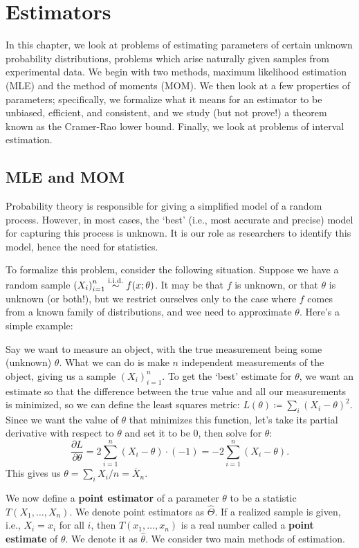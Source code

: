 \chapter{Estimators}
In this chapter, we look at problems of estimating parameters of certain unknown probability distributions, problems which arise naturally given samples from experimental data. 
We begin with two methods, maximum likelihood estimation (MLE) and the method of moments (MOM). 
We then look at a few properties of parameters; specifically, we formalize what it means for an estimator to be unbiased, efficient, and consistent, and we study (but not prove!) a theorem known as the Cramer-Rao lower bound. 
Finally, we look at problems of interval estimation. 

\section{MLE and MOM}
Probability theory is responsible for giving a simplified model of a random process. 
However, in most cases, the `best' (i.e., most accurate and precise) model for capturing this process is unknown. 
It is our role as researchers to identify this model, hence the need for statistics. 

To formalize this problem, consider the following situation. 
Suppose we have a random sample \({(X_i)}_{i=1}^n \stackrel{\mathrm{i.i.d.}}{\sim} f(x; \theta)\). 
It may be that \(f\) is unknown, or that \(\theta\) is unknown (or both!), but we restrict ourselves only to the case where \(f\) comes from a known family of distributions, and wee need to approximate \(\theta\). 
Here's a simple example: 
\begin{example}
    Say we want to measure an object, with the true measurement being some (unknown) \(\theta\). 
    What we can do is make \(n\) independent measurements of the object, giving us a sample \({(X_i)}_{i=1}^n\). 
    To get the `best' estimate for \(\theta\), we want an estimate so that the difference between the true value and all our measurements is minimized, so we can define the least squares metric: \(L(\theta) \coloneq \sum_i {(X_i - \theta)}^2\). 
    Since we want the value of \(\theta\) that minimizes this function, let's take its partial derivative with respect to \(\theta\) and set it to be 0, then solve for \(\theta\):\[
    \frac{\partial L}{\partial \theta} = 2\sum_{i=1}^n (X_i - \theta) \cdot (-1) = -2\sum_{i=1}^n (X_i - \theta). 
    \]This gives us \(\theta = \sum_i X_i / n = \overline{X}_n\).
\end{example}

We now define a \textbf{point estimator} of a parameter \(\theta\) to be a statistic \(T(X_1, \ldots , X_n)\).
We denote point estimators as \(\hat{\Theta}\). 
If a realized sample is given, i.e., \(X_i = x_i\) for all \(i\), then \(T(x_1, \ldots , x_n) \) is a real number called a \textbf{point estimate} of \(\theta\). 
We denote it as \(\hat{\theta}\). 
We consider two main methods of estimation. 
